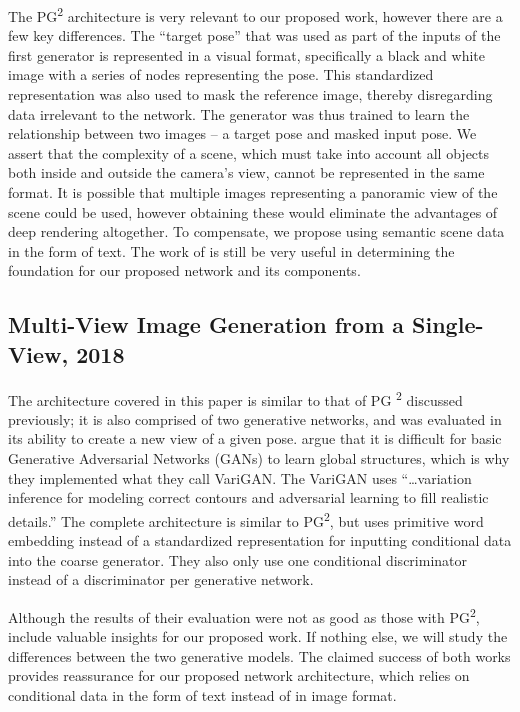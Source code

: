 \documentclass{article}
\begin{document}
The PG\textsuperscript{2} architecture is very relevant to our proposed work,
however there are a few key differences. The ``target pose'' that was used as 
part of the inputs of the first generator is represented in a visual format,
specifically a black and white image with a series of nodes representing the
pose. This standardized representation was also used to mask the reference image,
thereby disregarding data irrelevant to the network.
The generator was thus trained to learn the relationship between two
images -- a target pose and masked input pose. We assert that the complexity of a
scene, which must take into account all objects both
inside and outside the camera's view, cannot be represented in the same format.
It is possible that multiple images representing a panoramic view of the scene
could be used, however obtaining these would eliminate the advantages of deep
rendering altogether. To compensate, we propose using semantic scene data in the
form of text. The work of \cite{pose_guided_image_generation}
is still be very useful in determining the
foundation for our proposed network and its components.

\subsection*{Multi-View Image Generation from a Single-View, 2018}
\nocite{multi_view}
The architecture covered in this paper is similar to that of PG
\textsuperscript{2}
discussed previously; it is also comprised of two generative
networks, and was evaluated in its ability to create a new view of a given pose.
\cite{multi_view} argue that it is difficult for basic
Generative Adversarial Networks (GANs) to learn global structures,
which is why they implemented what they
call VariGAN. The VariGAN uses
``\dots variation inference for modeling correct contours and adversarial
learning to fill realistic details.'' The complete architecture
is similar to PG\textsuperscript{2}, but uses primitive word embedding instead of
a standardized representation for inputting conditional data into the coarse
generator. They also only use one conditional discriminator instead of a 
discriminator per generative network.

Although the results of their evaluation were not as good as those with
PG\textsuperscript{2}, \cite{multi_view} include valuable insights for
our proposed work. If nothing else, we will study the differences between the two
generative models. The claimed success of both works provides reassurance for our
proposed network architecture, which relies on conditional data in the form of
text instead of in image format.
\end{document}
